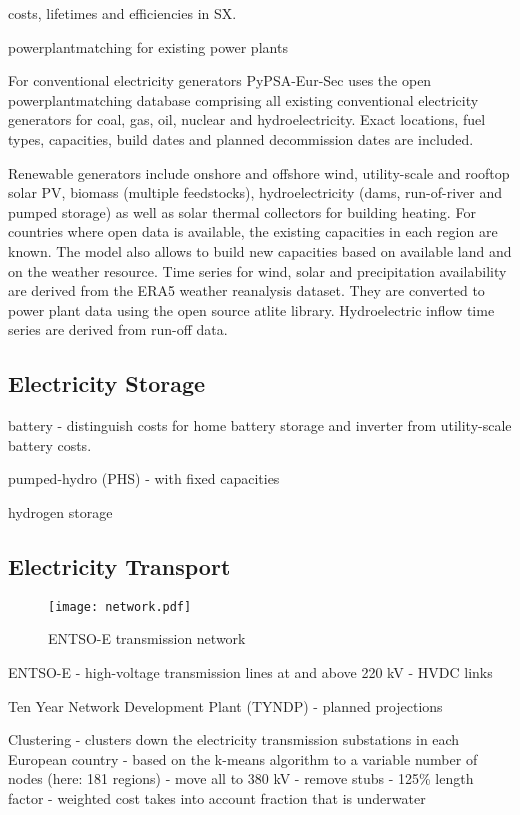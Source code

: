 costs, lifetimes and efficiencies in SX.

powerplantmatching for existing power plants 

For conventional electricity generators PyPSA-Eur-Sec uses the open
powerplantmatching database comprising all existing conventional electricity
generators for coal, gas, oil, nuclear and hydroelectricity. Exact locations,
fuel types, capacities, build dates and planned decommission dates are included.

Renewable generators include onshore and offshore wind, utility-scale and
rooftop solar PV, biomass (multiple feedstocks), hydroelectricity (dams,
run-of-river and pumped storage) as well as solar thermal collectors for
building heating. For countries where open data is available, the existing
capacities in each region are known. The model also allows to build new
capacities based on available land and on the weather resource. Time series for
wind, solar and precipitation availability are derived from the ERA5 weather
reanalysis dataset. They are converted to power plant data using the open source
atlite library. Hydroelectric inflow time series are derived from run-off data.

\subsection{Electricity Storage}

battery
- distinguish costs for home battery storage and inverter from utility-scale battery costs.

pumped-hydro (PHS)
- with fixed capacities

hydrogen storage

\subsection{Electricity Transport}

\begin{figure}
    \texttt{[image: network.pdf]}
    \label{fig:network}
    \caption{ENTSO-E transmission network}
\end{figure}

ENTSO-E
- high-voltage transmission lines at and above 220 kV
- HVDC links

Ten Year Network Development Plant (TYNDP)
- planned projections

Clustering
- clusters down the electricity transmission substations in each European country
- based on the k-means algorithm to a variable number of nodes (here: 181 regions)
- move all to 380 kV
- remove stubs
- 125\% length factor
- weighted cost takes into account fraction that is underwater

